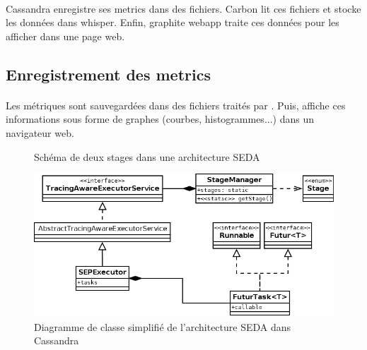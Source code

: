 \documentclass[12pt]{article}
\begin{document}
\paragraph{} Cassandra enregistre ses metrics dans des fichiers.
Carbon lit ces fichiers et stocke les données dans whisper.
Enfin, graphite webapp traite ces données pour les afficher dans une page web.

\subsection{Enregistrement des metrics}







\paragraph{} Les métriques sont sauvegardées dans des fichiers traités par . 
Puis,  affiche ces informations sous forme de graphes (courbes, histogrammes...) dans un navigateur web.

\newpage



\begin{figure}[p]
	\centering
		
	\caption{Schéma de deux stages dans une architecture SEDA \label{fig:stages}}
\end{figure}

\begin{figure}[p]
	\centering
		\includegraphics[width=15cm]{schemas/stages_diagram.png}
	\caption{Diagramme de classe simplifié de l'architecture SEDA dans Cassandra \label{fig:stages_diagram}}
\end{figure}
\end{document}
